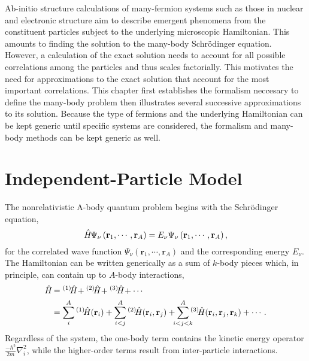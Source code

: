 \documentclass[thesis.tex]{subfiles}
\begin{document}
Ab-initio structure calculations of many-fermion systems such as those in nuclear and electronic structure aim to describe emergent phenomena from the constituent particles subject to the underlying microscopic Hamiltonian.  This amounts to finding the solution to the many-body Schr\"{o}dinger equation.  However, a calculation of the exact solution needs to account for all possible correlations among the particles and thus scales factorially.  This motivates the need for approximations to the exact solution that account for the most important correlations.  This chapter first establishes the formalism neccesary to define the many-body problem then illustrates several successive approximations to its solution.  Because the type of fermions and the underlying Hamiltonian can be kept generic until specific systems are considered, the formalism and many-body methods can be kept generic as well.


\section{Independent-Particle Model}
The nonrelativistic A-body quantum problem begins with the Schr\"{o}dinger equation,
\begin{equation} \label{eq:schrodinger}
  \hat{H}\hspace{-1pt}\Psi_{\nu}\left(\mathbf{r}_{1},\cdots,\mathbf{r}_{A}\right) = E_{\nu}\Psi_{\nu}\left(\mathbf{r}_{1},\cdots,\mathbf{r}_{A}\right),
\end{equation}
for the correlated wave function $\Psi_{\nu}\left(\mathbf{r}_{1},\cdots,\mathbf{r}_{A}\right)$ and the corresponding energy $E_{\nu}$.  The Hamiltonian can be written generically as a sum of $k$-body pieces which, in principle, can contain up to $A$-body interactions,
\begin{align} \label{eq:hamiltonian}
  \Ham &= \HamB{1} + \HamB{2} + \HamB{3} + \cdots \notag \\
  &= \sum^{A}_{\mathclap{i}}\HamB{1}\left(\mathbf{r}_{i}\right) + \sum^{A}_{\mathclap{i<j}}\HamB{2}\left(\mathbf{r}_{i},\mathbf{r}_{j}\right) + \sum^{A}_{\mathclap{i<j<k}}\HamB{3}\left(\mathbf{r}_{i},\mathbf{r}_{j},\mathbf{r}_{k}\right) + \cdots.
\end{align}
Regardless of the system, the one-body term contains the kinetic energy operator $\frac{-\hbar^{2}}{2m}\nabla^{2}_{i}$, while the higher-order terms result from inter-particle interactions.
\end{document}
